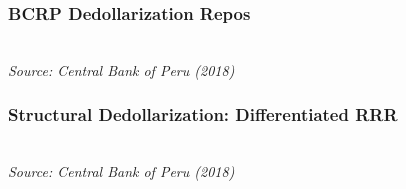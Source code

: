 \documentclass{beamer}
\begin{document}
\begin{frame}
\frametitle{BCRP Dedollarization Repos}
 \\
\bigskip
\emph{Source: Central Bank of Peru (2018)}
\end{frame}


\begin{frame}
\frametitle{Structural Dedollarization: Differentiated RRR}
 \\
\bigskip
\emph{Source: Central Bank of Peru (2018)}
\end{frame}
\end{document}
